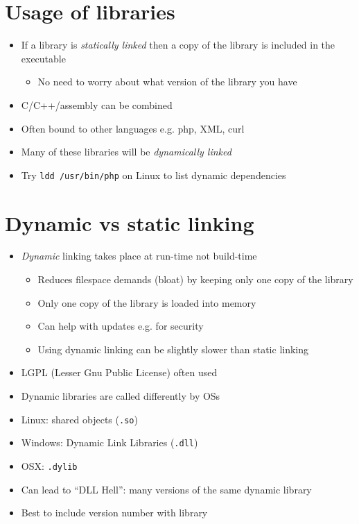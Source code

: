 \documentclass{article}
\begin{document}
\section{Usage of libraries}
\begin{itemize}
\item If a library is \emph{statically linked} then a copy of the library is included in the executable
\begin{itemize}
\item No need to worry about what version of the library you have
\end{itemize}
\item C/C++/assembly can be combined
\item Often bound to other languages e.g. php, XML, curl
\item Many of these libraries will be \emph{dynamically linked}
\item Try \verb!ldd /usr/bin/php! on Linux to list dynamic dependencies
\end{itemize}



\section{Dynamic vs static linking}
\begin{itemize}
\item \emph{Dynamic} linking takes place at run-time not build-time
\begin{itemize}
\item Reduces filespace demands (bloat) by keeping only one copy of the library
\item Only one copy of the library is loaded into memory
\item Can help with updates e.g. for security
\item Using dynamic linking can be slightly slower than static linking
\end{itemize}
\item LGPL (Lesser Gnu Public License) often used
\item Dynamic libraries are called differently by OSs
\item Linux: shared objects (\verb!.so!)
\item Windows: Dynamic Link Libraries (\verb!.dll!)
\item OSX: \verb!.dylib!
\item Can lead to ``DLL Hell'': many versions of the same dynamic library
\item Best to include version number with library
\end{itemize}
\end{document}
